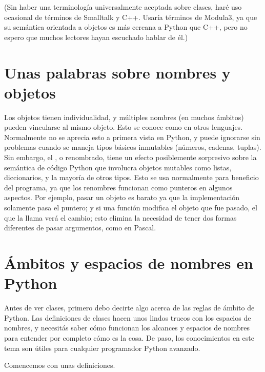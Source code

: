 \documentclass[a4,10pt,spanish]{sphinxmanual}
\begin{document}
\sphinxAtStartPar
(Sin haber una terminología universalmente aceptada sobre clases, haré uso ocasional de términos de Smalltalk y C++.  Usaría términos de Modula\sphinxhyphen{}3, ya que su semántica orientada a objetos es más cercana a Python que C++, pero no espero que muchos lectores hayan escuchado hablar de él.)


\section{Unas palabras sobre nombres y objetos}
\label{\detokenize{tutorial/classes:a-word-about-names-and-objects}}\label{\detokenize{tutorial/classes:tut-object}}
\sphinxAtStartPar
Los objetos tienen individualidad, y múltiples nombres (en muchos ámbitos) pueden vincularse al mismo objeto.  Esto se conoce como  en otros lenguajes.  Normalmente no se aprecia esto a primera vista en Python, y puede ignorarse sin problemas cuando se maneja tipos básicos inmutables (números, cadenas, tuplas).  Sin embargo, el , o renombrado,  tiene un efecto posiblemente sorpresivo sobre la semántica de código Python que involucra objetos mutables como listas, diccionarios, y la mayoría de otros tipos.  Esto se usa normalmente para beneficio del programa, ya que los renombres funcionan como punteros en algunos aspectos.  Por ejemplo, pasar un objeto es barato ya que la implementación solamente pasa el puntero; y si una función modifica el objeto que fue pasado, el que la llama verá el cambio; esto elimina la necesidad de tener dos formas diferentes de pasar argumentos, como en Pascal.


\section{Ámbitos y espacios de nombres en Python}
\label{\detokenize{tutorial/classes:python-scopes-and-namespaces}}\label{\detokenize{tutorial/classes:tut-scopes}}
\sphinxAtStartPar
Antes de ver clases, primero debo decirte algo acerca de las reglas de ámbito de Python.  Las definiciones de clases hacen unos lindos trucos con los espacios de nombres, y necesitás saber cómo funcionan los alcances y espacios de nombres para entender por completo cómo es la cosa.  De paso, los conocimientos en este tema son útiles para cualquier programador Python avanzado.

\sphinxAtStartPar
Comencemos con unas definiciones.
\end{document}
